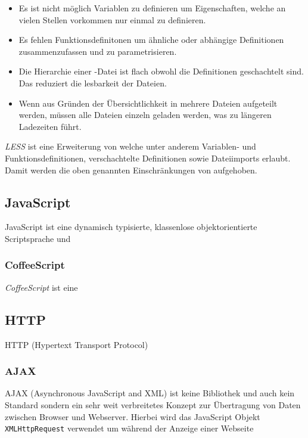 \begin{itemize} 
  \item Es ist nicht möglich Variablen zu definieren um Eigenschaften, welche an
vielen Stellen vorkommen nur einmal zu definieren. 
  \item Es fehlen Funktionsdefinitonen um ähnliche
oder abhängige Definitionen  zusammenzufassen und zu parametrisieren. 
  \item Die Hierarchie einer
-Datei ist flach obwohl die Definitionen geschachtelt sind. Das reduziert die lesbarkeit
der Dateien. 
  \item Wenn aus Gründen der Übersichtlichkeit  in mehrere Dateien aufgeteilt
werden, müssen alle Dateien einzeln geladen werden, was zu längeren Ladezeiten führt. \end{itemize}

\textit{LESS} ist eine Erweiterung von  welche unter anderem  Variablen- und
Funktionsdefinitionen, verschachtelte Definitionen sowie  Dateiimports erlaubt. Damit werden die
oben genannten Einschränkungen von  aufgehoben.

\subsection{JavaScript}

JavaScript ist eine dynamisch typisierte, klassenlose objektorientierte  Scriptsprache und

\subsubsection{CoffeeScript}

\textit{CoffeeScript} ist eine

\subsection{HTTP}

HTTP (Hypertext Transport Protocol)

\subsubsection{AJAX}

AJAX (Asynchronous JavaScript and XML) ist keine Bibliothek und auch kein  Standard sondern ein sehr
weit verbreitetes Konzept zur Übertragung von Daten  zwischen Browser und Webserver. Hierbei wird
das JavaScript Objekt  \texttt{XMLHttpRequest} verwendet um während der Anzeige einer Webseite

